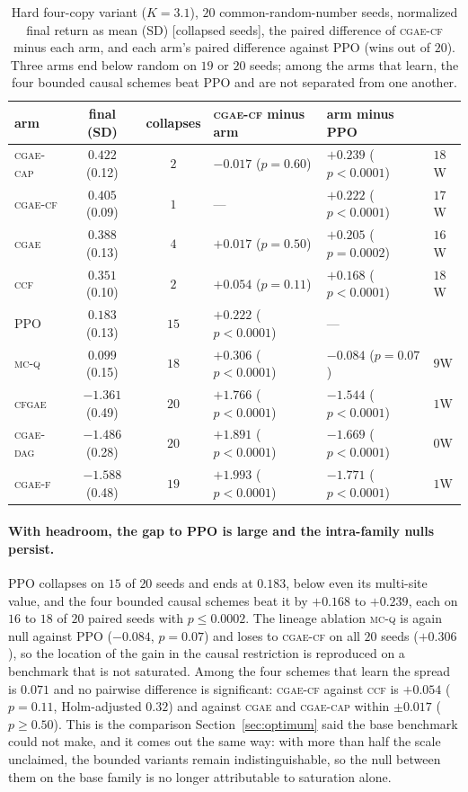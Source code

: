 \documentclass[review,authoryear,3p,times]{elsarticle}
\newcommand{\cgae}{\textsc{cgae}}              %
\newcommand{\cflow}{\textsc{cgae-cf}}          %
\newcommand{\cflowraw}{\textsc{cgae-f}}        %
\newcommand{\cdag}{\textsc{cgae-dag}}          %
\newcommand{\ccap}{\textsc{cgae-cap}}          %
\newcommand{\ccf}{\textsc{ccf}}
\newcommand{\mcq}{\textsc{mc-q}}
\newcommand{\cfgae}{\textsc{cfgae}}
\begin{document}
\begin{table}[tbp]
\centering
\caption{Hard four-copy variant ($K{=}3.1$), $20$ common-random-number seeds,
normalized final return as mean (SD) [collapsed seeds], the paired difference
of \cflow{} minus each arm, and each arm's paired difference against PPO
(wins out of $20$). Three arms end below random on $19$ or $20$ seeds; among
the arms that learn, the four bounded causal schemes beat PPO and are not
separated from one another.}
\label{tab:hard}
\small
\begin{tabular}{lcclll}
\toprule
arm & final (SD) & collapses & \cflow{} minus arm & arm minus PPO & \\
\midrule
\ccap      & $0.422$ {\tiny(0.12)} & $2$  & $-0.017$ ($p=0.60$) & $+0.239$ ($p<0.0001$) & $18$W \\
\cflow     & $0.405$ {\tiny(0.09)} & $1$  & --- & $+0.222$ ($p<0.0001$) & $17$W \\
\cgae      & $0.388$ {\tiny(0.13)} & $4$  & $+0.017$ ($p=0.50$) & $+0.205$ ($p=0.0002$) & $16$W \\
\ccf       & $0.351$ {\tiny(0.10)} & $2$  & $+0.054$ ($p=0.11$) & $+0.168$ ($p<0.0001$) & $18$W \\
PPO        & $0.183$ {\tiny(0.13)} & $15$ & $+0.222$ ($p<0.0001$) & --- & \\
\mcq       & $0.099$ {\tiny(0.15)} & $18$ & $+0.306$ ($p<0.0001$) & $-0.084$ ($p=0.07$) & $9$W \\
\cfgae     & $-1.361$ {\tiny(0.49)} & $20$ & $+1.766$ ($p<0.0001$) & $-1.544$ ($p<0.0001$) & $1$W \\
\cdag      & $-1.486$ {\tiny(0.28)} & $20$ & $+1.891$ ($p<0.0001$) & $-1.669$ ($p<0.0001$) & $0$W \\
\cflowraw  & $-1.588$ {\tiny(0.48)} & $19$ & $+1.993$ ($p<0.0001$) & $-1.771$ ($p<0.0001$) & $1$W \\
\bottomrule
\end{tabular}
\end{table}

\paragraph{With headroom, the gap to PPO is large and the intra-family nulls
persist.} PPO collapses on $15$ of $20$ seeds and ends at $0.183$, below
even its multi-site value, and the four bounded causal schemes beat it by $+0.168$
to $+0.239$, each on $16$ to $18$ of $20$ paired seeds with $p\le0.0002$. The
lineage ablation \mcq{} is again null against PPO ($-0.084$, $p=0.07$) and
loses to \cflow{} on all $20$ seeds ($+0.306$), so the location of the gain in
the causal restriction is reproduced on a benchmark that is not saturated.
Among the four schemes that learn the spread is $0.071$ and no pairwise
difference is significant: \cflow{} against \ccf{} is $+0.054$ ($p=0.11$,
Holm-adjusted $0.32$) and against \cgae{} and \ccap{} within $\pm0.017$
($p\ge0.50$). This is the comparison Section~\ref{sec:optimum} said the base
benchmark could not make, and it comes out the same way: with more than half
the scale unclaimed, the bounded variants remain indistinguishable, so the null
between them on the base family is no longer attributable to saturation alone.
\end{document}
